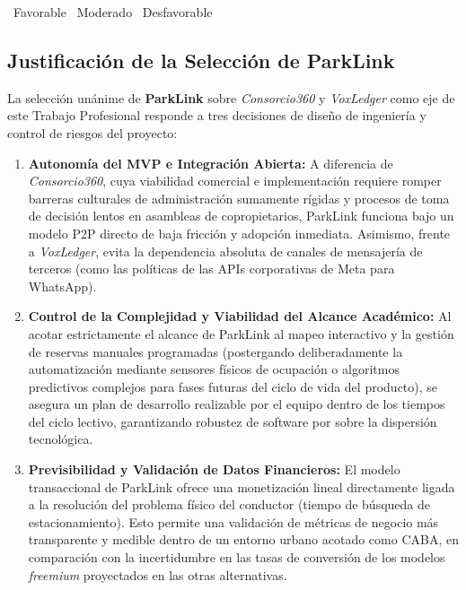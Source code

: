 \noindent\gcircle~Favorable \quad \ycircle~Moderado \quad \rcircle~Desfavorable


\subsection{Justificación de la Selección de ParkLink}
La selección unánime de \textbf{ParkLink} sobre \textit{Consorcio360} y \textit{VoxLedger} como eje de este Trabajo Profesional responde a tres decisiones de diseño de ingeniería y control de riesgos del proyecto:

\begin{enumerate}
    \item \textbf{Autonomía del MVP e Integración Abierta:} A diferencia de \textit{Consorcio360}, cuya viabilidad comercial e implementación requiere romper barreras culturales de administración sumamente rígidas y procesos de toma de decisión lentos en asambleas de copropietarios, ParkLink funciona bajo un modelo P2P directo de baja fricción y adopción inmediata. Asimismo, frente a \textit{VoxLedger}, evita la dependencia absoluta de canales de mensajería de terceros (como las políticas de las APIs corporativas de Meta para WhatsApp).
    \item \textbf{Control de la Complejidad y Viabilidad del Alcance Académico:} Al acotar estrictamente el alcance de ParkLink al mapeo interactivo y la gestión de reservas manuales programadas (postergando deliberadamente la automatización mediante sensores físicos de ocupación o algoritmos predictivos complejos para fases futuras del ciclo de vida del producto), se asegura un plan de desarrollo realizable por el equipo dentro de los tiempos del ciclo lectivo, garantizando robustez de software por sobre la dispersión tecnológica.
    \item \textbf{Previsibilidad y Validación de Datos Financieros:} El modelo transaccional de ParkLink ofrece una monetización lineal directamente ligada a la resolución del problema físico del conductor (tiempo de búsqueda de estacionamiento). Esto permite una validación de métricas de negocio más transparente y medible dentro de un entorno urbano acotado como CABA, en comparación con la incertidumbre en las tasas de conversión de los modelos \textit{freemium} proyectados en las otras alternativas.
\end{enumerate}
